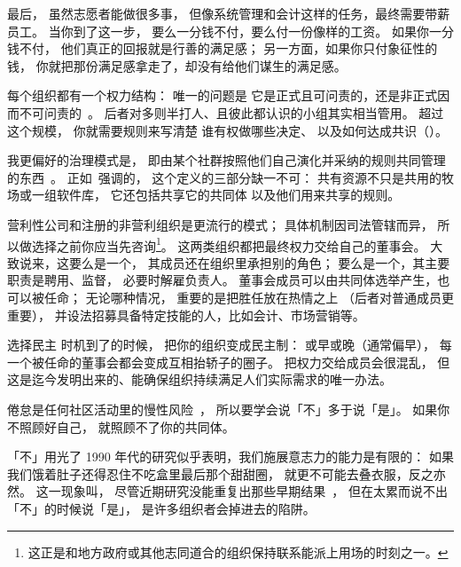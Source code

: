 最后，
虽然志愿者能做很多事，
但像系统管理和会计这样的任务，最终需要带薪员工。
当你到了这一步，
要么一分钱不付，要么付一份像样的工资。
如果你一分钱不付，
他们真正的回报就是行善的满足感；
另一方面，如果你只付象征性的钱，
你就把那份满足感拿走了，却没有给他们谋生的满足感。


每个组织都有一个权力结构：
唯一的问题是
它是正式且可问责的，还是非正式因而不可问责的~\cite{Free1972}。
后者对多则半打人、且彼此都认识的小组其实相当管用。
超过这个规模，
你就需要规则来写清楚
谁有权做哪些决定、
以及如何达成共识（）。

我更偏好的治理模式是，
即由某个社群按照他们自己演化并采纳的规则共同管理的东西~\cite{Ostr2015}。
正如~\cite{Boll2014}强调的，
这个定义的三部分缺一不可：
共有资源不只是共用的牧场或一组软件库，
它还包括共享它的共同体
以及他们用来共享的规则。

营利性公司和注册的非营利组织是更流行的模式；
具体机制因司法管辖而异，
所以做选择之前你应当先咨询\footnote{
  这正是和地方政府或其他志同道合的组织保持联系能派上用场的时刻之一。}。
这两类组织都把最终权力交给自己的董事会。
大致说来，这要么是一个，
其成员还在组织里承担别的角色；
要么是一个，其主要职责是聘用、监督，
必要时解雇负责人。
董事会成员可以由共同体选举产生，也可以被任命；
无论哪种情况，
重要的是把胜任放在热情之上
（后者对普通成员更重要），
并设法招募具备特定技能的人，比如会计、市场营销等。

\begin{aside}{选择民主}
  时机到了的时候，
  把你的组织变成民主制：
  或早或晚（通常偏早），
  每一个被任命的董事会都会变成互相抬轿子的圈子。
  把权力交给成员会很混乱，
  但这是迄今发明出来的、能确保组织持续满足人们实际需求的唯一办法。
\end{aside}


倦怠是任何社区活动里的慢性风险~\cite{Pign2016}，
所以要学会说「不」多于说「是」。
如果你不照顾好自己，
就照顾不了你的共同体。

\begin{aside}{「不」用光了}
  1990 年代的研究似乎表明，我们施展意志力的能力是有限的：
  如果我们饿着肚子还得忍住不吃盒里最后那个甜甜圈，
  就更不可能去叠衣服，反之亦然。
  这一现象叫，
  尽管近期研究没能重复出那些早期结果~\cite{Hagg2016}，
  但在太累而说不出「不」的时候说「是」，
  是许多组织者会掉进去的陷阱。
\end{aside}

